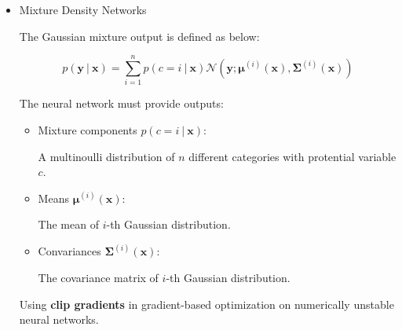   \begin{itemize}

%
%

    \item{Mixture Density Networks}

    The Gaussian mixture output is defined as below:

    \begin{equation} \tag{6.35}
      \label{eq_6_35}
      p( \bm{y}\ |\ \bm{x} ) =
        \sum ^ n _ {i=1} p( c=i\ |\ \bm{x} )
        \mathcal{N}( \bm{y}; \bm{\mu} ^ {(i)} (\bm{x}), \bm{\Sigma} ^ {(i)} (\bm{x}) )
    \end{equation}

    The neural network must provide outputs:

    \begin{itemize}

      \item{Mixture components $p(c = i\ |\ \bm{x})$:}

        A multinoulli distribution of $n$ different categories with protential variable $c$.

      \item{Means $\bm{\mu} ^ {(i)} (\bm{x})$:}

        The mean of $i$-th Gaussian distribution.

      \item{Convariances $\bm{\Sigma} ^ {(i)} (\bm{x})$:}

        The covariance matrix of $i$-th Gaussian distribution.

    \end{itemize}

      Using \textbf{clip gradients} in gradient-based optimization on numerically unstable neural networks.

    \newpage


\end{itemize}
